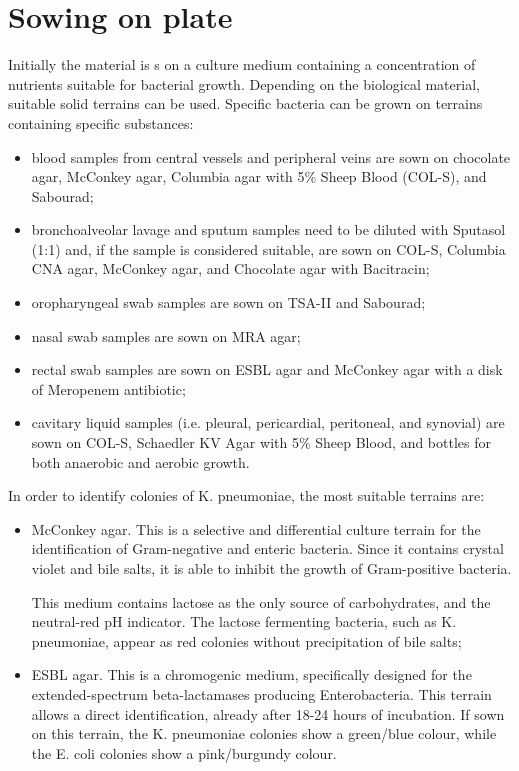 \documentclass[11pt]{report}
\begin{document}
\section{Sowing on plate}
Initially the material is s on a culture medium containing a concentration of nutrients suitable for bacterial growth.
Depending on the biological material, suitable solid terrains can be used. 
Specific bacteria can be grown on terrains containing specific substances:
\begin{itemize}
\item blood samples from central vessels and peripheral veins are sown on chocolate agar, McConkey agar, Columbia agar with 5$\%$ Sheep Blood (COL-S), and Sabourad;
\item bronchoalveolar lavage and sputum samples need to be diluted with Sputasol (1:1) and, if the sample is considered suitable, are sown on COL-S, Columbia CNA agar, McConkey agar, and Chocolate agar with Bacitracin;
\item oropharyngeal swab samples are sown on TSA-II and Sabourad;
\item nasal swab samples are sown on MRA agar;
\item rectal swab samples are sown on ESBL agar and McConkey agar with a disk of Meropenem antibiotic;
\item cavitary liquid samples (i.e. pleural, pericardial, peritoneal, and synovial) are sown on COL-S, Schaedler KV Agar with 5$\%$ Sheep Blood, and bottles for both anaerobic and aerobic growth.
\end{itemize}

In order to identify colonies of K. pneumoniae, the most suitable terrains are:
\begin{itemize}
\item McConkey agar.
This is a selective and differential culture terrain for the identification of Gram-negative and enteric bacteria.
Since it contains crystal violet and bile salts, it is able to inhibit the growth of Gram-positive bacteria. 

This medium contains lactose as the only source of carbohydrates, and the neutral-red pH indicator.
The lactose fermenting bacteria, such as K. pneumoniae, appear as red colonies without precipitation of bile salts;
\item ESBL agar.
This is a chromogenic medium, specifically designed for the extended-spectrum beta-lactamases producing Enterobacteria. This terrain allows a direct identification, already after 18-24 hours of incubation.
If sown on this terrain, the K. pneumoniae colonies show a green/blue colour, while the E. coli colonies show a pink/burgundy colour.
\end{itemize}
\end{document}
